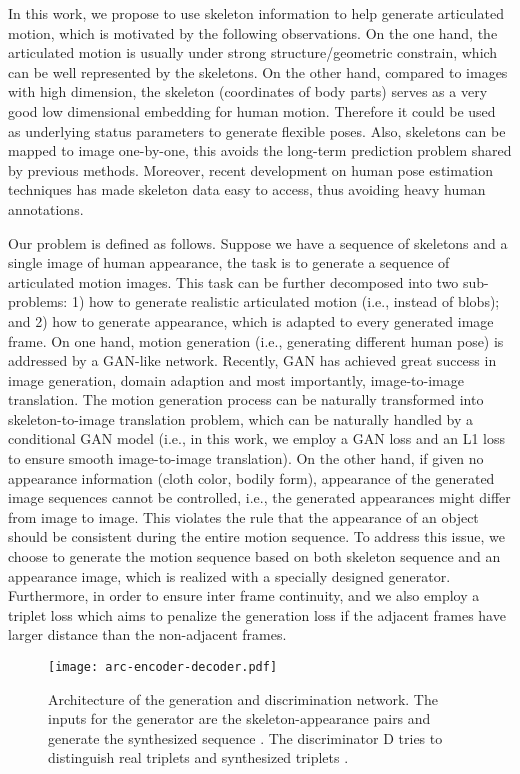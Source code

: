 \documentclass[journal]{IEEEtran}
\begin{document}
In this work, we propose to use skeleton information to help generate articulated motion, which is motivated by the following observations.
On the one hand, the articulated motion is usually under strong structure/geometric constrain, which can be well represented by the skeletons.
On the other hand, compared to images with high dimension, the skeleton (coordinates of body parts) serves as a very good low dimensional embedding for human motion. Therefore it could be used as underlying status parameters to generate flexible poses. Also, skeletons can be mapped to image one-by-one, this avoids the long-term prediction problem shared by previous methods.
Moreover, recent development on human pose estimation techniques has made skeleton data easy to access, thus avoiding heavy human annotations.

Our problem is defined as follows. Suppose we have a sequence of skeletons and a single image of human appearance, the task is to generate a sequence of articulated motion images. This task can be further decomposed into two sub-problems: 1) how to generate realistic articulated motion (i.e., instead of blobs); and 2) how to generate appearance, which is adapted to every generated image frame.
On one hand, motion generation (i.e., generating different human pose) is addressed by a GAN-like network. Recently, GAN has achieved great success in image generation, domain adaption and most importantly, image-to-image translation. The motion generation process can be naturally transformed into skeleton-to-image translation problem, which can be naturally handled by a conditional GAN model (i.e., in this work, we employ a GAN loss and an L1 loss to ensure smooth image-to-image translation). On the other hand, if given no appearance information (cloth color, bodily form), appearance of the generated image sequences cannot be controlled, i.e., the generated appearances might differ from image to image. This violates the rule that the appearance of an object should be consistent during the entire motion sequence. To address this issue, we choose to generate the motion sequence based on both skeleton sequence and an appearance image, which is realized with a specially designed generator. Furthermore, in order to ensure inter frame continuity, and we also employ a triplet loss which aims to penalize the generation loss if the adjacent frames have larger distance than the non-adjacent frames.
\begin{figure*}
\texttt{[image: arc-encoder-decoder.pdf]}
\caption{Architecture of the generation and discrimination network. The inputs for the generator are the skeleton-appearance pairs  and generate the synthesized sequence . The discriminator D tries to distinguish real triplets  and synthesized triplets .}
\label{fig:arc}
\end{figure*}
\end{document}
